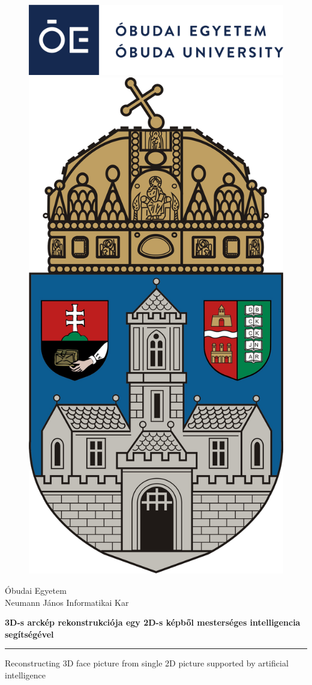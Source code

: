 \documentclass[12pt,a4]{article}
\begin{document}
	
	
	\renewcommand*\contentsname{Tartalomjegyzék}	
	
	\begin{titlepage}
		\begin{figure}
			\centering
			\begin{minipage}{.5\textwidth}
				\centering
				\includegraphics[width=.9\linewidth]{oelogo}
			\end{minipage}%
			\begin{minipage}{.5\textwidth}
				\centering
				\includegraphics[width=.3\linewidth]{oe}
			\end{minipage}
		\end{figure}
		\vspace{0.5cm}			
		\begin{center}			
			\Large
			Óbudai Egyetem\\
			Neumann János Informatikai Kar\\
			
			\vspace*{0.5cm}
			
			\Huge
			\textbf{3D-s arckép rekonstrukciója egy 2D-s képből mesterséges intelligencia segítségével}
			\par\noindent\rule{\textwidth}{0.4pt}
			
			\vspace{0.5cm}
			\normalsize
			Reconstructing 3D face picture from single 2D picture supported by artificial intelligence
			

\end{center}
\end{titlepage}
\end{document}
